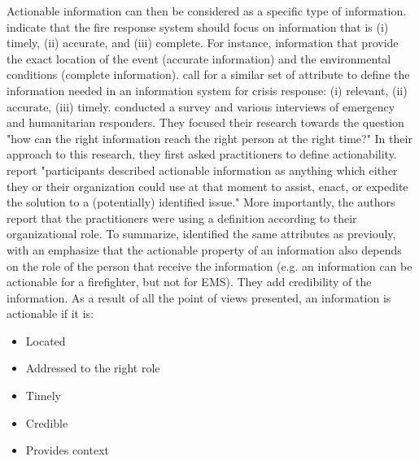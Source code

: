 Actionable information can then be considered as a specific type of information.
\textcite{yangDesignPrinciplesIntegrated2012} indicate that the fire response system should focus on information that is (i) timely, (ii) accurate, and (iii) complete.
For instance, information that provide the exact location of the event (accurate information) and the environmental conditions (complete information).
\textcite{comesBringingStructureDisaster2015} call for a similar set of attribute to define the information needed in an information system for crisis response: (i) relevant, (ii) accurate, (iii) timely.
\textcite{zadeSituationalAwarenessActionability2018} conducted a survey and various interviews of emergency and humanitarian responders.
They focused their research towards the question "how can the right information reach the right person at the right time?"
In their approach to this research, they first asked practitioners to define actionability.
\textcite{zadeSituationalAwarenessActionability2018} report "participants described actionable
information as anything which either they or their organization could use at that moment to assist,
enact, or expedite the solution to a (potentially) identified issue."
More importantly, the authors report that the practitioners were using a definition according to their organizational role.
To summarize, \citeauthor{zadeSituationalAwarenessActionability2018} identified the same
attributes as previouly, with an emphasize that the actionable property of an information
also depends on the role of the person that receive the information (e.g. an information
can be actionable for a firefighter, but not for EMS).
They add credibility of the information.
As a result of all the point of views presented, an information is actionable if it is:

\begin{itemize}
    \item Located
    \item Addressed to the right role
    \item Timely
    \item Credible
    \item Provides context
\end{itemize}

